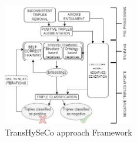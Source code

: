 \documentclass[sigconf]{acmart}
\newcommand{\TransHI}{TransHySeCo\xspace}
\begin{document}
\begin{figure}[t]
\centering
\includegraphics[width=0.5\textwidth]{Images/overview.jpg}
\caption{\TransHI approach Framework}
\label{fig:overview}
\end{figure}
\end{document}
